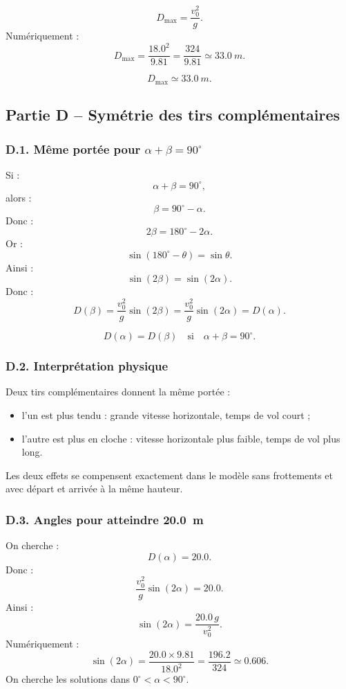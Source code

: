 \documentclass[11pt,a4paper]{article}
\begin{document}
\[
D_{\max}=\frac{v_0^2}{g}.
\]
Numériquement :
\[
D_{\max}=\frac{18.0^2}{9.81}
=\frac{324}{9.81}
\simeq 33.0\ \si{m}.
\]

\begin{resultatbox}
\[
\boxed{D_{\max}\simeq \SI{33.0}{m}.}
\]
\end{resultatbox}

\subsection{Partie D -- Symétrie des tirs complémentaires}

\subsubsection*{D.1. Même portée pour $\alpha+\beta=90^\circ$}

Si :
\[
\alpha+\beta=90^\circ,
\]
alors :
\[
\beta=90^\circ-\alpha.
\]
Donc :
\[
2\beta=180^\circ-2\alpha.
\]
Or :
\[
\sin(180^\circ-\theta)=\sin\theta.
\]
Ainsi :
\[
\sin(2\beta)=\sin(2\alpha).
\]
Donc :
\[
D(\beta)=\frac{v_0^2}{g}\sin(2\beta)
=
\frac{v_0^2}{g}\sin(2\alpha)
=
D(\alpha).
\]

\begin{resultatbox}
\[
\boxed{D(\alpha)=D(\beta)\quad\text{si}\quad \alpha+\beta=90^\circ.}
\]
\end{resultatbox}

\subsubsection*{D.2. Interprétation physique}

Deux tirs complémentaires donnent la même portée :
\begin{itemize}
  \item l'un est plus tendu : grande vitesse horizontale, temps de vol court ;
  \item l'autre est plus en cloche : vitesse horizontale plus faible, temps de vol plus long.
\end{itemize}
Les deux effets se compensent exactement dans le modèle sans frottements et avec départ et arrivée à la même hauteur.

\subsubsection*{D.3. Angles pour atteindre \SI{20.0}{m}}

On cherche :
\[
D(\alpha)=20.0.
\]
Donc :
\[
\frac{v_0^2}{g}\sin(2\alpha)=20.0.
\]
Ainsi :
\[
\sin(2\alpha)=\frac{20.0\,g}{v_0^2}.
\]
Numériquement :
\[
\sin(2\alpha)=\frac{20.0\times 9.81}{18.0^2}
=\frac{196.2}{324}
\simeq 0.606.
\]
On cherche les solutions dans $0^\circ<\alpha<90^\circ$.
\end{document}
